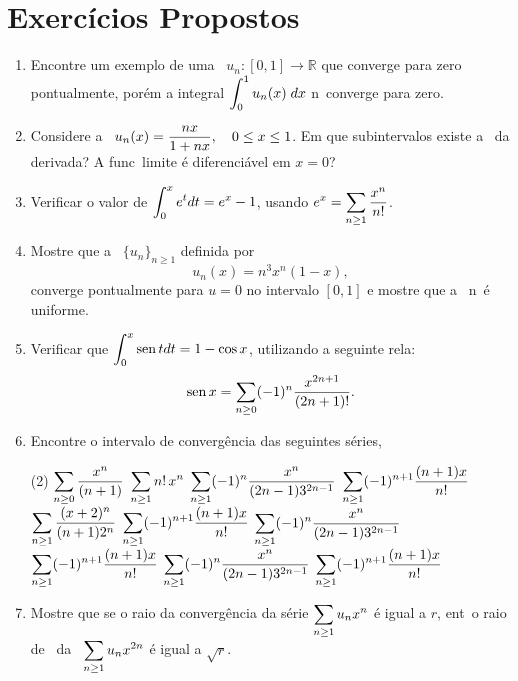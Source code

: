 \section*{Exercícios Propostos}
\begin{enumerate}[label=(\arabic*)]
\item Encontre um exemplo de uma  \seq\ $u_n\colon [0,1] \to
  \mathbb{R}$ que converge para zero pontualmente, por\'em a
  integral $\displaystyle{\int_0^1u_n(x)\;dx}$ n\ao\ converge para zero.

\item Considere a \seq\ $u_n(x)=\displaystyle{\frac{n x}{1+nx}},\quad 0\leq x\leq
  1$. Em que subintervalos existe a \conv\ da derivada? A
  func\ao\ limite \'e diferenci\'avel em $x=0$?

\item Verificar o valor de $\displaystyle{\int_0^x e^t dt= e^x -1}$,
  usando $\displaystyle{e^x=\sum_{n\geq1}\frac{x^n}{n!}}$.

\item Mostre que a \seq\ $\{u_n\}_{n\geq 1}$ definida por
  $$u_n(x)=n^3x^n(1-x),$$
converge pontualmente para $u=0$ no intervalo $[0,1]$ e mostre que
a \conv\ n\ao\ \'e uniforme.

\item Verificar que $\displaystyle{\int_0^x\operatorname{sen}t dt=1-\cos x}$, utilizando
a seguinte rela\cao :
$$
\operatorname{sen} x = \sum_{n\geq 0}(-1)^n\frac{x^{2n+1}}{(2n+1)!}.
$$

\item Encontre o intervalo de converg\^encia das seguintes s\'eries,
\begin{tasks}[label=(\alph*),label-width=2em,ref=(\alph*)](2)
\task \(\displaystyle\sum_{n\geq 0}\frac{x^n}{(n+1)} \)
\task \(\displaystyle \sum_{n\geq 1}n!\, x^{n}\)
\task \(\displaystyle \sum_{n\geq 1}(-1)^n\frac{x^n}{(2n-1)3^{2n-1}}\)
\task \(\displaystyle \sum_{n\geq 1}(-1)^{n+1}\frac{(n+1)x}{n!}\)
\task \(\displaystyle \sum_{n\geq 1}\dfrac{(x+2)^n}{(n+1)2^n}\)
\task \(\displaystyle \sum_{n\geq 1}(-1)^{n+1}\dfrac{(n+1)x}{n!}\)
\task \(\displaystyle \sum_{n\geq 1}(-1)^n\dfrac{x^n}{(2n-1)3^{2n-1}}\)
\task \(\displaystyle \sum_{n\geq 1}(-1)^{n+1}\dfrac{(n+1)x}{n!}\)
\task \(\displaystyle \sum_{n\geq 1}(-1)^n\dfrac{x^n}{(2n-1)3^{2n-1}}\)
\task \(\displaystyle \sum_{n\geq 1}(-1)^{n+1}\dfrac{(n+1)x}{n!}\)
\end{tasks}

\item Mostre que se o raio da convergência da s\'erie
$\displaystyle{\sum_{n\geq 1}u_n x^{n}}$ \'e igual a $r$, ent\ao\ o raio de \conv\ da \ser\ $\displaystyle{\sum_{n\geq 1}u_n x^{2n}}$ \'e igual a
$\sqrt{r}$.


\end{enumerate}
